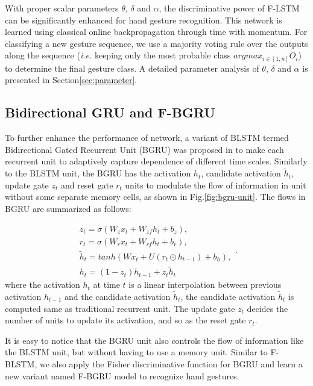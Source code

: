 \documentclass[review]{elsarticle}
\begin{document}
With proper scalar parameters $\theta$, $\delta$ and $\alpha$, the discriminative power of F-LSTM can be significantly enhanced for hand gesture recognition. This network is learned using classical online backpropagation through time with momentum. For classifying a new gesture sequence, we use a majority voting rule over the outputs along the sequence (\emph{i.e.} keeping only the most probable class $argmax _{i \in \left[ {1,n} \right]}{O_i}$) to determine the final gesture class. A detailed parameter analysis of $\theta$, $\delta$ and $\alpha$ is presented in Section\;\ref{sec:parameter}.

\subsection{Bidirectional GRU and F-BGRU}\label{sec:bgru}
To further enhance the performance of network, a variant of BLSTM termed Bidirectional Gated Recurrent Unit (BGRU) was proposed in\;\cite{cho2014arxiv,chung2014eprint} to make each recurrent unit to adaptively capture dependence of different time scales. Similarly to the BLSTM unit, the BGRU has the activation $h_t$, candidate activation $\tilde{h}_t$, update gate $z_t$ and reset gate $r_t$ units to modulate the flow of information in unit without some separate memory cells, as shown in Fig.\;\ref{fig:bgru-unit}. The flows in BGRU are summarized as follows:

\begin{equation}
\begin{array}{l}
{z_t} = \sigma \left( {{W_z}{x_t} + {W_{zf}}{h_t} + {b_z}} \right),\\
{r_t} = \sigma \left( {{W_r}{x_t} + {W_{rf}}{h_t} + {b_r}} \right),\\
{{\tilde h}_t} = tanh\left( {W{x_t} + U\left( {{r_t} \odot {h_{t - 1}}} \right) + {b_h}} \right),\\
{h_t} = \left( {1 - {z_t}} \right){h_{t - 1}} + {z_t}{{\tilde h}_t}
\end{array}.
\label{eq:bgru-unit}
\end{equation}
where the activation $h_t$ at time $t$ is a linear interpolation between previous activation $h_{t-1}$ and the candidate activation $\tilde{h}_t$, the candidate activation $\tilde{h}_t$ is computed same as traditional recurrent unit. The update gate $z_t$ decides the number of units to update its activation, and so as the reset gate $r_t$.

It is easy to notice that the BGRU unit also controls the flow of information like the BLSTM unit, but without having to use a memory unit. Similar to F-BLSTM, we also apply the Fisher discriminative function for BGRU and learn a new variant named F-BGRU model to recognize hand gestures.
\end{document}
